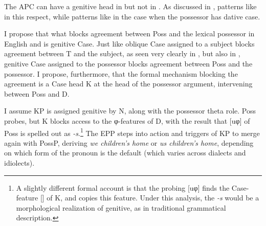 \documentclass[output=paper]{langsci/langscibook}
\begin{document}
The \gls{APC} can have a genitive head in  but not in . As
discussed in ,  patterns like  in this
respect, while  patterns like  in the case when the possessor
has dative case.

I propose that what blocks agreement between Poss and the lexical possessor in
English and  is genitive Case. Just like oblique Case
assigned to a subject blocks agreement between T and the subject, as seen very
clearly in  \citep{Thrainsson2007}, but also in 
\parencites{LaitinenVilkuna1993}[209--210]{Holmberg2010b}, genitive Case assigned to the possessor blocks agreement between Poss and the
possessor. I propose, furthermore, that the formal mechanism blocking the
agreement is a Case head K at the head of the possessor argument, intervening
between Poss and D.

\ea\label{ex:16.45}
\z

I assume KP is assigned genitive by N, along with the possessor theta role.
Poss probes, but K blocks access to the φ-features of D, with the result that
[uφ] of Poss is spelled out as \emph{-s}.\footnote{ A slightly different formal
account is that the probing [uφ] finds the Case-feature [\Gen{}] of K, and
copies this feature. Under this analysis, the \emph{-s} would be a
morphological realization of genitive, as in traditional grammatical
description.} The \gls{EPP} steps into action and triggers  of KP to merge
again with PossP, deriving \emph{we children’s home} or \emph{us children’s
home}, depending on which form of the pronoun is the default (which varies
across dialects and idiolects).
\end{document}
